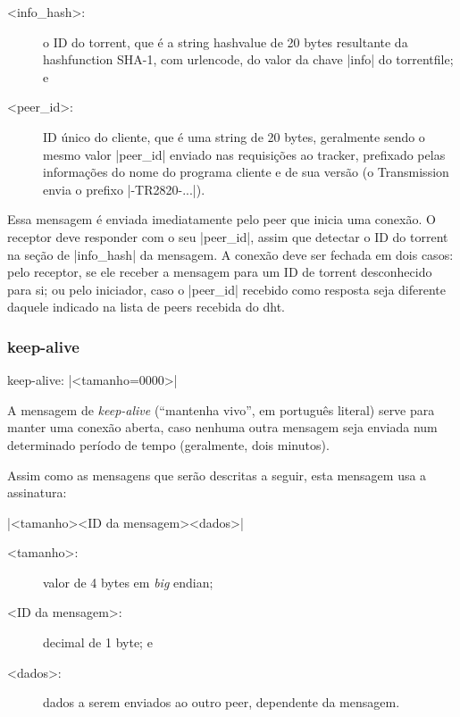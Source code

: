 \begin{description}
    \item[<info_hash>:] o ID do \gls*{torrent}, que é a \gls*{string}
        \gls*{hashvalue} de 20 bytes resultante da \gls*{hashfunction} SHA-1, com
        \gls*{urlencode}, do valor da chave \bverb|info| do \gls*{torrentfile}; e

    \item[<peer_id>:] ID único do cliente, que é uma \gls*{string} de 20 bytes,
        geralmente sendo o mesmo valor \bverb|peer_id| enviado nas requisições ao
        \gls*{tracker}, prefixado pelas informações do nome do programa cliente e de sua
        versão (o Transmission envia o prefixo \sverb|-TR2820-...|).
\end{description}


Essa mensagem é enviada imediatamente pelo \gls*{peer} que inicia uma conexão. O
receptor deve responder com o seu \bverb|peer_id|, assim que detectar o ID do
\gls*{torrent} na seção de \bverb|info_hash| da mensagem. A conexão deve ser fechada em
dois casos: pelo receptor, se ele receber a mensagem para um ID de \gls*{torrent}
desconhecido para si; ou pelo iniciador, caso o \bverb|peer_id| recebido como resposta
seja diferente daquele indicado na lista de \glspl*{peer} recebida do \gls*{dht}.

\subsubsection*{keep-alive}

keep-alive: \bverb|<tamanho=0000>|

A mensagem de \emph{keep-alive} (``mantenha vivo'', em português literal) serve para
manter uma conexão aberta, caso nenhuma outra mensagem seja enviada num determinado
período de tempo (geralmente, dois minutos).

Assim como as mensagens que serão descritas a seguir, esta mensagem usa a assinatura:

\bverb|<tamanho><ID da mensagem><dados>|

\begin{description}
    \item[<tamanho>:] valor de 4 bytes em \emph{big} \gls{endian};

    \item[<ID da mensagem>:] decimal de 1 byte; e

    \item[<dados>:] dados a serem enviados ao outro \gls*{peer}, dependente da
        mensagem.
\end{description}

